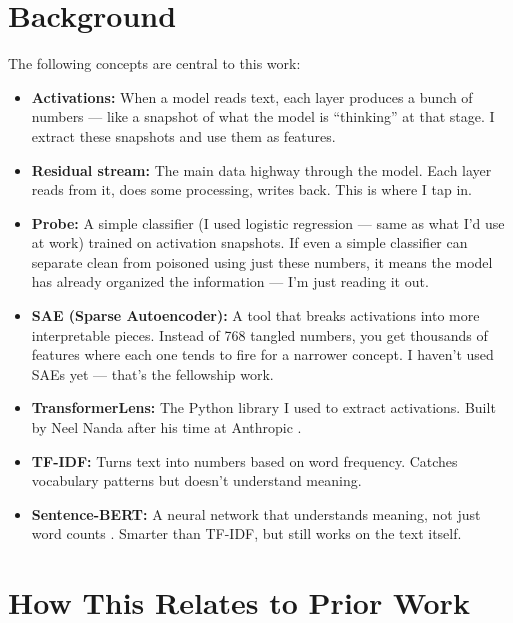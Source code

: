 \documentclass[11pt]{article}
\begin{document}
\section{Background}

The following concepts are central to this work:

\begin{itemize}
\item \textbf{Activations:} When a model reads text, each layer produces a bunch of numbers --- like a snapshot of what the model is ``thinking'' at that stage. I extract these snapshots and use them as features.
\item \textbf{Residual stream:} The main data highway through the model. Each layer reads from it, does some processing, writes back. This is where I tap in.
\item \textbf{Probe:} A simple classifier (I used logistic regression --- same as what I'd use at work) trained on activation snapshots. If even a simple classifier can separate clean from poisoned using just these numbers, it means the model has already organized the information --- I'm just reading it out.
\item \textbf{SAE (Sparse Autoencoder):} A tool that breaks activations into more interpretable pieces. Instead of 768 tangled numbers, you get thousands of features where each one tends to fire for a narrower concept. I haven't used SAEs yet --- that's the fellowship work.
\item \textbf{TransformerLens:} The Python library I used to extract activations. Built by Neel Nanda after his time at Anthropic \citep{nanda2022transformerlens}.
\item \textbf{TF-IDF:} Turns text into numbers based on word frequency. Catches vocabulary patterns but doesn't understand meaning.
\item \textbf{Sentence-BERT:} A neural network that understands meaning, not just word counts \citep{reimers2019sentencebert}. Smarter than TF-IDF, but still works on the text itself.
\end{itemize}

\section{How This Relates to Prior Work}
\end{document}
